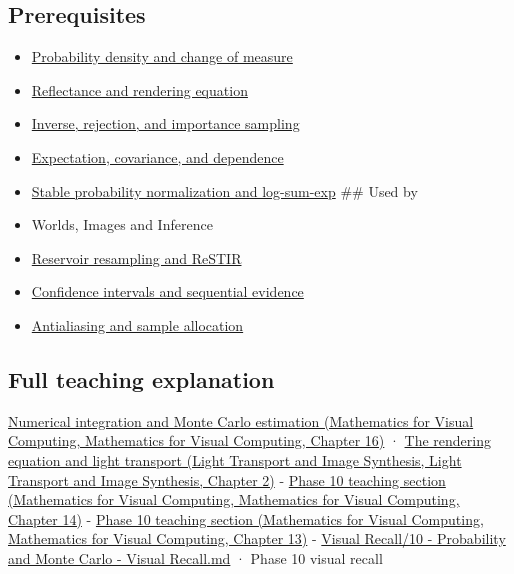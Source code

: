 \subsection{Prerequisites}\label{appendix-031e02bf28af-prerequisites}

\begin{itemize}
\item
  \hyperref[appendix-4815cd87ab8b]{Probability density and change of measure}
\item
  \hyperref[appendix-96da0b153b77]{Reflectance and rendering equation}
\item
  \hyperref[appendix-8d863ed954d0]{Inverse, rejection, and importance sampling}
\item
  \hyperref[appendix-54c383df9992]{Expectation, covariance, and dependence}
\item
  \hyperref[appendix-d580b422240f]{Stable probability normalization and log-sum-exp} \#\# Used by
\item
  {Worlds, Images and Inference}
\item
  \hyperref[appendix-68be451b78b1]{Reservoir resampling and ReSTIR}
\item
  \hyperref[appendix-c83016554b1e]{Confidence intervals and sequential evidence}
\item
  \hyperref[appendix-4192b2bdd21e]{Antialiasing and sample allocation}
\end{itemize}

\subsection{Full teaching explanation}\label{appendix-031e02bf28af-full-teaching-explanation}

\href{../02-Mathematics-for-Visual-Computing/main.pdf\#nameddest=03-visual-computing-i-ch012-numerical-integration-and-monte-carlo-estimation}{Numerical integration and Monte Carlo estimation (Mathematics for Visual Computing, Mathematics for Visual Computing, Chapter 16)} · \href{../04-Light-Transport-and-Image-Synthesis/main.pdf\#nameddest=03-visual-computing-i-ch007-the-rendering-equation-and-light-transport}{The rendering equation and light transport (Light Transport and Image Synthesis, Light Transport and Image Synthesis, Chapter 2)} - \href{../02-Mathematics-for-Visual-Computing/main.pdf\#nameddest=02-foundations-ii-ch030-monte-carlo-estimates-trade-computation-for-uncertainty}{Phase 10 teaching section (Mathematics for Visual Computing, Mathematics for Visual Computing, Chapter 14)} - \href{../02-Mathematics-for-Visual-Computing/main.pdf\#nameddest=02-foundations-ii-ch029-transformations-turn-simple-inputs-into-useful-samples}{Phase 10 teaching section (Mathematics for Visual Computing, Mathematics for Visual Computing, Chapter 13)} - \hyperref[appendix-cb5af353ef77]{Visual Recall/10 - Probability and Monte Carlo - Visual Recall.md} · Phase 10 visual recall
